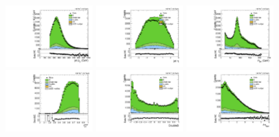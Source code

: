 \begin{figure}[htbp]
  \centering
  \includegraphics[width=0.3\textwidth]{fig/controlPlots/CR_b1_allL_allP_allC_allD_Run2_lnujj_l2_pt.pdf}
  \includegraphics[width=0.3\textwidth]{fig/controlPlots/CR_b1_allL_allP_allC_allD_Run2_lnujj_l2_eta.pdf}
  \includegraphics[width=0.3\textwidth]{fig/controlPlots/CR_b1_allL_allP_allC_allD_Run2_mjet.pdf}\\
  \includegraphics[width=0.3\textwidth]{fig/controlPlots/CR_b1_allL_allP_allC_allD_Run2_tau21DDT.pdf}
  \includegraphics[width=0.3\textwidth]{fig/controlPlots/CR_b1_allL_allP_allC_allD_Run2_DoubleB.pdf}
  \includegraphics[width=0.3\textwidth]{fig/controlPlots/CR_b1_allL_allP_allC_allD_Run2_lnujj_vbfDEta.pdf}\\

\end{figure}
